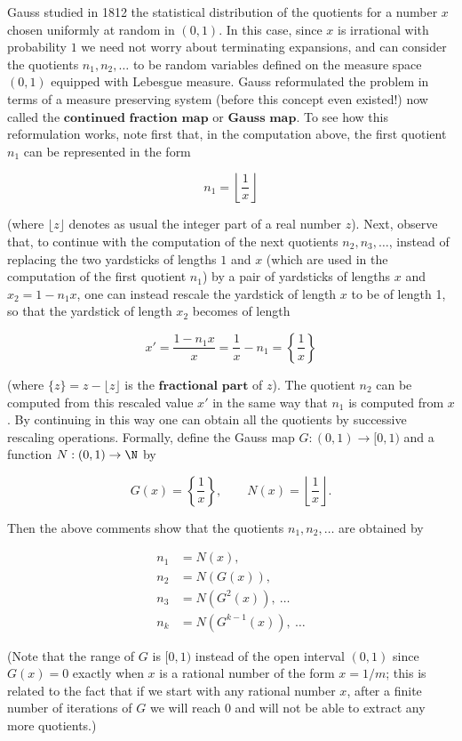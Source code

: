 \begin{enumerate}[label=\arabic*.]
\noindent Gauss studied in 1812 the statistical distribution of
the quotients for a number $x$ chosen uniformly at
random in $(0,1)$. In this case, since $x$ is
irrational with probability $1$ we need not worry
about terminating expansions, and can consider the
quotients $n_1, n_2, \ldots$ to be random variables
defined on the measure space $(0,1)$ equipped with
Lebesgue measure. Gauss reformulated the problem in
terms of a measure preserving system (before this
concept even existed!) now called the
$\textbf{continued fraction map}$ or
$\textbf{Gauss map}$. To see how this reformulation
works, note first that, in the computation above, the
first quotient $n_1$ can be represented in the form

\[
n_1 = \left\lfloor \frac{1}{x} \right\rfloor
\]

\noindent (where $\lfloor z \rfloor$ denotes as usual the
integer part of a real number $z$). Next, observe
that, to continue with the computation of the next
quotients $n_2,n_3,\ldots$, instead of replacing the
two yardsticks of lengths $1$ and $x$ (which are used
in the computation of the first quotient $n_1$) by a
pair of yardsticks of lengths $x$ and $x_2=1-n_1 x$,
one can instead rescale the yardstick of length $x$
to be of length 1, so that the yardstick of length
$x_2$ becomes of length

\[
x'=\frac{1-n_1 x}{x} = \frac{1}{x}-n_1 = \left\{ \frac{1}{x} \right\}
\]

\noindent (where $\{z\}=z-\lfloor z\rfloor$ is the
$\textbf{fractional part}$ of $z$). The quotient $n_2$
can be computed from this rescaled value $x'$ in the
same way that $n_1$ is computed from $x$. By
continuing in this way one can obtain all the
quotients by successive rescaling operations.
Formally, define the Gauss map $G:(0,1)\to[0,1)$ and
a function $N:(0,1)\to\N$ by

\[
G(x) = \left\{ \frac{1}{x}\right\}, \qquad
N(x) = \left\lfloor \frac{1}{x}\right\rfloor.
\]

\noindent Then the above comments show that the quotients
$n_1,n_2,\ldots$ are obtained by

\begin{align*}
n_1 &= N(x), \\
n_2 &= N(G(x)), \\
n_3 &= N(G^2(x)), \ \ldots \\
n_k &= N(G^{k-1}(x)), \ \ldots
\end{align*}

\noindent (Note that the range of $G$ is $[0,1)$ instead of the
open interval $(0,1)$ since $G(x)=0$ exactly when $x$
is a rational number of the form $x=1/m$; this is
related to the fact that if we start with any rational
number $x$, after a finite number of iterations of $G$
we will reach $0$ and will not be able to extract any
more quotients.)


\end{enumerate}
